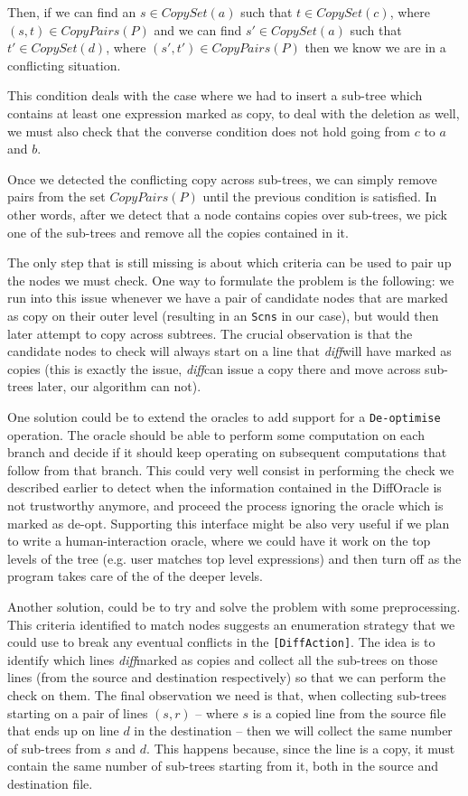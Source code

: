 \documentclass[11pt, titlepage]{article}
\newcommand{\diff}{\emph{diff}}
\begin{document}
Then, if we can find an $s \in CopySet(a)$ such that $t \in CopySet(c)$, where $(s,t) \in CopyPairs(P)$ and we can find $s' \in CopySet(a)$ such that $t' \in CopySet(d)$, where $(s',t') \in CopyPairs(P)$ then we know we are in a conflicting situation. 

This condition deals with the case where we had to insert a sub-tree which 
contains at least one expression marked as copy, to deal with the deletion as well, we 
must also check that the converse condition does not hold going from $c$ to $a$ 
and $b$.

Once we detected the conflicting copy across sub-trees, we can simply remove pairs from the set $CopyPairs(P)$ until the previous condition is satisfied. In other words, after we detect that a node contains copies over sub-trees, we pick one of the sub-trees and remove all the copies contained in it.


The only step that is still missing is about which criteria can be used to pair up the nodes we must check. 
One way to formulate the problem is the following: we run into this issue whenever we have a pair of candidate nodes that are marked as copy on their outer level (resulting in an \texttt{Scns} in our case), but would then later attempt to copy across subtrees.  
The crucial observation is that the candidate nodes to check will always start on a line that \diff will have marked as copies (this is exactly the issue, \diff can issue a copy there and move across sub-trees later, our algorithm can not). 


One solution could be to extend the oracles to add support for a \texttt{De-optimise} operation. The oracle should be able to perform some computation on each branch 
and decide if it should keep operating on subsequent computations that follow from that branch.
This could very well consist in performing the check we described earlier to detect when the information contained in the DiffOracle is not trustworthy anymore, and proceed the process ignoring the oracle which is marked as de-opt. 
Supporting this interface might be also very useful if we plan to write a human-interaction oracle, where we could have it work on the top levels of the tree (e.g. user matches top level expressions) and then turn off as the program takes care of the of the deeper levels. 


Another solution, could be to try and solve the problem with some preprocessing.
This criteria identified to match nodes suggests an enumeration strategy that we could use to break any eventual conflicts in the \texttt{[DiffAction]}. 
The idea is to identify which lines \diff marked as copies and collect all the sub-trees on those lines (from the source and destination respectively) so that we can perform the check on them.
The final observation we need is that, when collecting sub-trees starting on a pair of lines $(s,r)$ -- where $s$ is a copied line from the source file that ends up on line $d$ in the destination -- then we will collect the same number of sub-trees from $s$ and $d$. 
This happens because, since the line is a copy, it must contain the same number of sub-trees starting from it, both in the source and destination file. 
\end{document}
